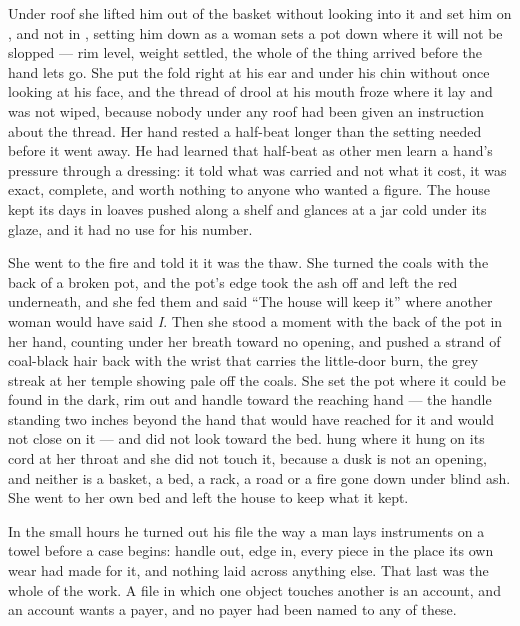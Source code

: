 Under  roof she lifted him out of the basket without looking into it and set him on , and not in , setting him down as a woman sets a pot down where it will not be slopped --- rim level, weight settled, the whole of the thing arrived before the hand lets go. She put the fold right at his ear and under his chin without once looking at his face, and the thread of drool at his mouth froze where it lay and was not wiped, because nobody under any roof had been given an instruction about the thread. Her hand rested a half-beat longer than the setting needed before it went away. He had learned that half-beat as other men learn a hand's pressure through a dressing: it told what was carried and not what it cost, it was exact, complete, and worth nothing to anyone who wanted a figure. The house kept its days in loaves pushed along a shelf and glances at a jar cold under its glaze, and it had no use for his number.

She went to the fire and told it it was the thaw. She turned the coals with the back of a broken pot, and the pot's edge took the ash off and left the red underneath, and she fed them and said “The house will keep it” where another woman would have said \emph{I}. Then she stood a moment with the back of the pot in her hand, counting under her breath toward no opening, and pushed a strand of coal-black hair back with the wrist that carries the little-door burn, the grey streak at her temple showing pale off the coals. She set the pot where it could be found in the dark, rim out and handle toward the reaching hand --- the handle standing two inches beyond the hand that would have reached for it and would not close on it --- and did not look toward the bed.  hung where it hung on its cord at her throat and she did not touch it, because a dusk is not an opening, and neither is a basket, a bed, a rack, a road or a fire gone down under blind ash. She went to her own bed and left the house to keep what it kept.

In the small hours he turned out his file the way a man lays instruments on a towel before a case begins: handle out, edge in, every piece in the place its own wear had made for it, and nothing laid across anything else. That last was the whole of the work. A file in which one object touches another is an account, and an account wants a payer, and no payer had been named to any of these.


